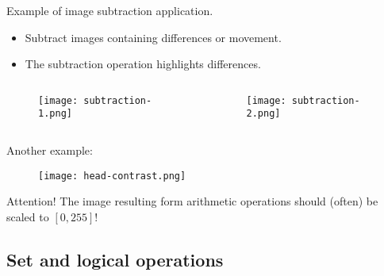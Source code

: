 
\begin{frame}
Example of image subtraction application.
\begin{itemize}
\item Subtract images containing differences or movement.
\item The subtraction operation highlights differences.
\end{itemize}
\begin{columns}
\begin{column}{.5\textwidth}
\begin{figure}
\centering
\texttt{[image: subtraction-1.png]}
\end{figure}
\end{column}
\begin{column}{.5\textwidth}
\begin{figure}
\centering
\texttt{[image: subtraction-2.png]}
\end{figure}
\end{column}
\end{columns}
\end{frame}


\begin{frame}
Another example:
\begin{figure}
\centering
\texttt{[image: head-contrast.png]}
\end{figure}
\end{frame}


\begin{frame}
\begin{block}{Attention!}
The image resulting form arithmetic operations should (often) be scaled to $[0,255]$!
\end{block}
\end{frame}


\subsection{Set and logical operations}


